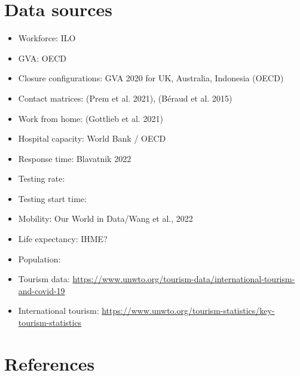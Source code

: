\documentclass[
]{article}
\providecommand{\tightlist}{%
  \setlength{\itemsep}{0pt}\setlength{\parskip}{0pt}}
\begin{document}
\newpage

\hypertarget{data-sources}{%
\section{Data sources}\label{data-sources}}

\begin{itemize}
\tightlist
\item
  Workforce: ILO
\item
  GVA: OECD
\item
  Closure configurations: GVA 2020 for UK, Australia, Indonesia (OECD)
\item
  Contact matrices: (Prem et al. 2021), (Béraud et al. 2015)
\item
  Work from home: (Gottlieb et al. 2021)
\item
  Hospital capacity: World Bank / OECD
\item
  Response time: Blavatnik 2022
\item
  Testing rate:
\item
  Testing start time:
\item
  Mobility: Our World in Data/Wang et al., 2022
\item
  Life expectancy: IHME?
\item
  Population:
\item
  Tourism data: \url{https://www.unwto.org/tourism-data/international-tourism-and-covid-19}
\item
  International tourism: \url{https://www.unwto.org/tourism-statistics/key-tourism-statistics}
\end{itemize}

\newpage

\hypertarget{references}{%
\section{References}\label{references}}
\end{document}
